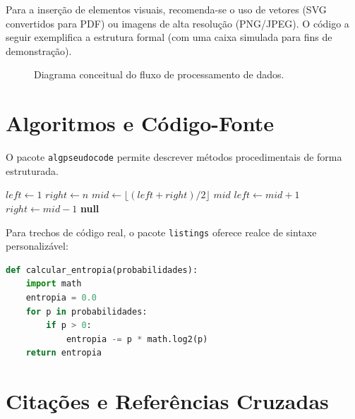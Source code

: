 \documentclass[11pt, a4paper]{article}
\theoremstyle{definition}
\theoremstyle{remark}
\begin{document}
Para a inserção de elementos visuais, recomenda-se o uso de vetores (SVG convertidos para PDF) ou imagens de alta resolução (PNG/JPEG). O código a seguir exemplifica a estrutura formal (com uma caixa simulada para fins de demonstração).

\begin{figure}[h]
\centering
{}
\caption{Diagrama conceitual do fluxo de processamento de dados.}
\label{fig:fluxo}
\end{figure}

\section{Algoritmos e Código-Fonte}
\label{sec:algoritmos}

O pacote \texttt{algpseudocode} permite descrever métodos procedimentais de forma estruturada.

\begin{algorithm}[h]
\caption{Busca Binária Iterativa}\label{alg:binarysearch}
\begin{algorithmic}[1]
    \State $left \gets 1$
    \State $right \gets n$
        \State $mid \gets \lfloor (left + right) / 2 \rfloor$
            \State \Return $mid$
            \State $left \gets mid + 1$
        \Else
            \State $right \gets mid - 1$
        \EndIf
    \EndWhile
    \State \Return \textbf{null}
\EndProcedure
\end{algorithmic}
\end{algorithm}

Para trechos de código real, o pacote \texttt{listings} oferece realce de sintaxe personalizável:

\begin{lstlisting}[language=Python, caption={Exemplo de implementação em Python.}, label={lst:python}]
def calcular_entropia(probabilidades):
    import math
    entropia = 0.0
    for p in probabilidades:
        if p > 0:
            entropia -= p * math.log2(p)
    return entropia
\end{lstlisting}

\section{Citações e Referências Cruzadas}
\label{sec:referencias}
\end{document}
